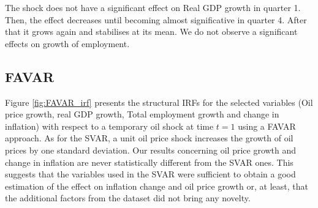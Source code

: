 \documentclass[11pt,a4paper]{article}
\begin{document}
The shock does not have a significant effect on Real GDP growth in quarter 1. Then, the effect decreases until becoming almost significative in quarter 4. After that it grows again and stabilises at its mean. 
We do not observe a significant effects on growth of employment. 


%


\subsection{FAVAR}



Figure \ref{fig:FAVAR_irf} presents the structural IRFs for the selected variables (Oil price growth, real GDP growth, Total employment growth and change in inflation) with respect to a temporary oil shock at time $t =1$ using a FAVAR approach. As for the SVAR, a unit oil price shock increases the growth of oil prices by one standard deviation. Our results concerning oil price growth and change in inflation are never statistically different from the SVAR ones. This suggests that the variables used in the SVAR were sufficient to obtain a good estimation of the effect on inflation change and oil price growth or, at least, that the additional factors from the dataset did not bring any novelty.
\end{document}

